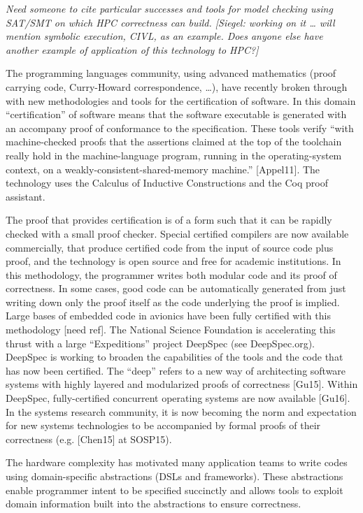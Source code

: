 {\small\em Need someone to cite particular successes and tools for model checking using SAT/SMT on which HPC correctness can build. [Siegel: working on it … will mention symbolic execution,
CIVL, as an example.   Does anyone else have another example of application of this technology to HPC?]}

The programming languages community, using advanced mathematics (proof carrying code, Curry-Howard correspondence, …), have recently broken through with new methodologies and tools for the certification of software. In this domain “certification” of software means that the software executable is generated with an accompany proof of conformance to the specification. These tools verify “with machine-checked proofs that the assertions claimed at the top of the toolchain really hold in the machine-language program, running in the operating-system context, on a weakly-consistent-shared-memory machine.” [Appel11]. The technology uses the Calculus of Inductive Constructions and the Coq proof assistant.

The proof that provides certification is of a form such that it can be rapidly checked with a small proof checker. Special certified compilers are now available commercially, that produce certified code from the input of source code plus proof, and the technology is open source and free for academic institutions. In this methodology, the programmer writes both modular code and its proof of correctness.  In some cases, good code can be automatically generated from just writing down only the proof itself as the code underlying the proof is implied. Large bases of embedded code in avionics have been fully certified with this methodology [need ref].  The National Science Foundation is accelerating this thrust with a large “Expeditions” project DeepSpec (see DeepSpec.org). DeepSpec is working to broaden the capabilities of the tools and the code that has now been certified.  The “deep” refers to a new way of architecting software systems with highly layered and modularized proofs of correctness [Gu15].  Within DeepSpec, fully-certified concurrent operating systems are now available [Gu16]. In the systems research community, it is now becoming the norm and expectation for new systems technologies to be accompanied by formal proofs of their correctness (e.g. [Chen15] at SOSP15).

The hardware complexity has motivated many application teams to write codes using domain-specific abstractions (DSLs and frameworks). These abstractions enable programmer intent to be specified succinctly and allows tools to exploit domain information built into the abstractions to ensure correctness.

